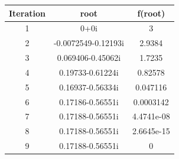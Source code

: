 \begin{center}
  \begin{tabular}{| c  c c |}
\hline
Iteration & root         & f(root) \\
\hline
1   &            0+0i         &             3   \\
\hline
2   &  -0.0072549-0.12193i    &       2.9384   \\
\hline
3   &     0.069406-0.45062i   &       1.7235  \\
\hline
4   &      0.19733-0.61224i   &      0.82578   \\
\hline
5   &     0.16937-0.56334i    &     0.047116   \\
\hline
6   &      0.17186-0.56551i   &     0.0003142   \\
\hline
7   &      0.17188-0.56551i   &    4.4741e-08  \\
\hline
8   &      0.17188-0.56551i   &    2.6645e-15    \\
\hline
9   &      0.17188-0.56551i   &             0   \\
\hline
\hline

\end{tabular}
\end{center}

